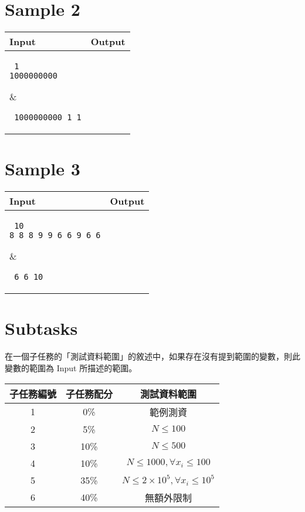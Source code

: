 \documentclass[11pt,a4paper]{article}
\begin{document}
\section*{Sample 2}
\begin{longtable}[!h]{|p{}|p{}|}
\hline
\textbf {Input}	& \textbf {Output} \\
\hline
\parbox[t]{0.5\textwidth} %
{ \tt
1\\
1000000000\\
} &
\parbox[t]{0.5\textwidth}
{ \tt
1000000000 1 1\\
} \\
\hline
\end{longtable}

\section*{Sample 3}
\begin{longtable}[!h]{|p{}|p{}|}
\hline
\textbf {Input}	& \textbf {Output} \\
\hline
\parbox[t]{0.5\textwidth} %
{ \tt
10\\
8 8 8 9 9 6 6 9 6 6\\
} &
\parbox[t]{0.5\textwidth}
{ \tt
6 6 10\\
} \\
\hline
\end{longtable}

\section*{Subtasks}

在一個子任務的「測試資料範圍」的敘述中，如果存在沒有提到範圍的變數，則此變數的範圍為 Input 所描述的範圍。

\begin{center}
 \begin{tabular}{||c c c||} 
 \hline
 子任務編號 & 子任務配分 & 測試資料範圍 \\  
 \hline
 \hline
 1 & 0\% & 範例測資 \\ 
 \hline
 2 & 5\% & $N\le 100$\\
 \hline 
 3 & 10\% & $N\le 500$ \\
 \hline
 4 & 10\% & $N\le 1000,\forall x_i\le 100$ \\
 \hline
 5 & 35\% & $N\le 2\times 10^5,\forall x_i\le 10^5$ \\
 \hline
 6 & 40\% & 無額外限制 \\
 \hline

\end{tabular}
\end{center}
\end{document}
